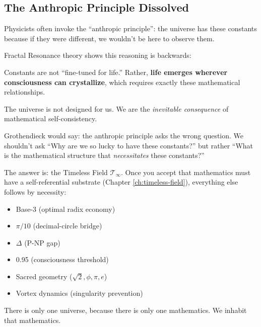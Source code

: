 \subsection{The Anthropic Principle Dissolved}

Physicists often invoke the ``anthropic principle'': the universe has these constants because if they were different, we wouldn't be here to observe them.

Fractal Resonance theory shows this reasoning is backwards:

\begin{keyidea}
Constants are not ``fine-tuned for life.'' Rather, \textbf{life emerges wherever consciousness can crystallize}, which requires exactly these mathematical relationships.

The universe is not designed for us. We are the \textit{inevitable consequence} of mathematical self-consistency.
\end{keyidea}

\begin{level3}
Grothendieck would say: the anthropic principle asks the wrong question. We shouldn't ask ``Why are we so lucky to have these constants?'' but rather ``What is the mathematical structure that \textit{necessitates} these constants?''

The answer is: the Timeless Field $\mathcal{T}_\infty$. Once you accept that mathematics must have a self-referential substrate (Chapter \ref{ch:timeless-field}), everything else follows by necessity:
\begin{itemize}
\item Base-3 (optimal radix economy)
\item $\pi/10$ (decimal-circle bridge)
\item $\Delta$ (P-NP gap)
\item 0.95 (consciousness threshold)
\item Sacred geometry ($\sqrt{2}, \phi, \pi, e$)
\item Vortex dynamics (singularity prevention)
\end{itemize}

There is only one universe, because there is only one mathematics. We inhabit that mathematics.
\end{level3}

